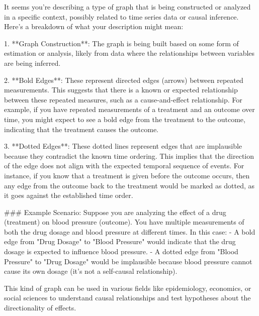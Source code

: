 It seems you're describing a type of graph that is being constructed or analyzed in a specific context, possibly related to time series data or causal inference. Here's a breakdown of what your description might mean:

1. **Graph Construction**: The graph is being built based on some form of estimation or analysis, likely from data where the relationships between variables are being inferred.

2. **Bold Edges**: These represent directed edges (arrows) between repeated measurements. This suggests that there is a known or expected relationship between these repeated measures, such as a cause-and-effect relationship. For example, if you have repeated measurements of a treatment and an outcome over time, you might expect to see a bold edge from the treatment to the outcome, indicating that the treatment causes the outcome.

3. **Dotted Edges**: These dotted lines represent edges that are implausible because they contradict the known time ordering. This implies that the direction of the edge does not align with the expected temporal sequence of events. For instance, if you know that a treatment is given before the outcome occurs, then any edge from the outcome back to the treatment would be marked as dotted, as it goes against the established time order.

### Example Scenario:
Suppose you are analyzing the effect of a drug (treatment) on blood pressure (outcome). You have multiple measurements of both the drug dosage and blood pressure at different times. In this case:
- A bold edge from "Drug Dosage" to "Blood Pressure" would indicate that the drug dosage is expected to influence blood pressure.
- A dotted edge from "Blood Pressure" to "Drug Dosage" would be implausible because blood pressure cannot cause its own dosage (it's not a self-causal relationship).

This kind of graph can be used in various fields like epidemiology, economics, or social sciences to understand causal relationships and test hypotheses about the directionality of effects.
